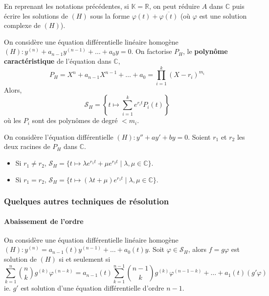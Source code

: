   \begin{remark}
    En reprenant les notations précédentes, si $\mathbb{K} = \mathbb{R}$, on peut réduire $A$ dans $\mathbb{C}$ puis écrire les solutions de $(H)$ sous la forme $\varphi(t) + \overline{\varphi(t)}$ (où $\varphi$ est une solution complexe de $(H)$).
  \end{remark}

  \begin{corollary}
    On considère une équation différentielle linéaire homogène $(H) : y^{(n)} + a_{n-1} y^{(n-1)} + \dots + a_0 y = 0$. On factorise $P_H$, le \textbf{polynôme caractéristique} de l'équation dans $\mathbb{C}$,
    \[ P_H = X^n + a_{n-1}X^{n-1} + \dots + a_0 = \prod_{i=1}^k (X-r_i)^{m_i} \]
    Alors,
    \[ \mathcal{S}_H = \left\{t \mapsto \sum_{i=1}^k e^{r_i t} P_i(t)\right\} \]
    où les $P_i$ sont des polynômes de degré $< m_i$.
  \end{corollary}

  \begin{example}
    On considère l'équation différentielle $(H) : y'' + ay' + by = 0$. Soient $r_1$ et $r_2$ les deux racines de $P_H$ dans $\mathbb{C}$.
    \begin{itemize}
      \item Si $r_1 \neq r_2$, $\mathcal{S}_H = \{t \mapsto \lambda e^{r_1 t} + \mu e^{r_2 t} \mid \lambda, \mu \in \mathbb{C}\}$.
      \item Si $r_1 = r_2$, $\mathcal{S}_H = \{t \mapsto (\lambda t + \mu) e^{r_1 t} \mid \lambda, \mu \in \mathbb{C}\}$.
    \end{itemize}
  \end{example}

  \subsubsection{Quelques autres techniques de résolution}

  \paragraph{Abaissement de l'ordre}

  \begin{proposition}
    On considère une équation différentielle linéaire homogène $(H) : y^{(n)} = a_{n-1}(t) y^{(n-1)} + \dots + a_0(t) y$. Soit $\varphi \in \mathcal{S}_H$, alors $f = g \varphi$ est solution de $(H)$ si et seulement si
    \[ \sum_{k=1}^n \binom{n}{k} g^{(k)} \varphi^{(n-k)} = a_{n-1}(t) \sum_{k=1}^{n-1} \binom{n-1}{k} g^{(k)} \varphi^{(n-1-k)} + \dots + a_1(t) (g' \varphi) \]
    ie. $g'$ est solution d'une équation différentielle d'ordre $n-1$.
  \end{proposition}

